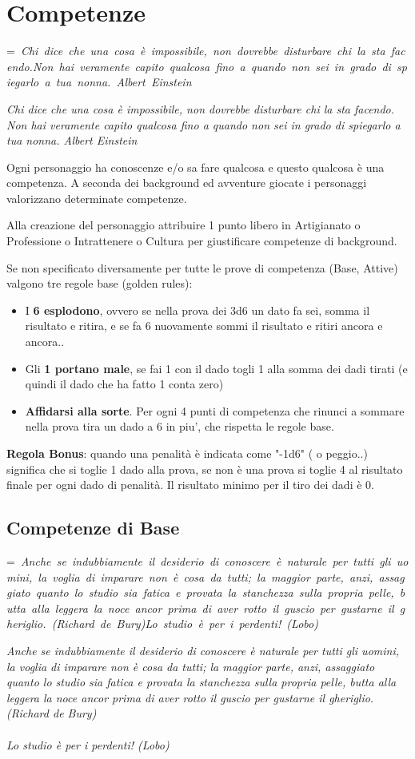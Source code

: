\documentclass[a4paper,11pt,twoside,openany]{book}
\makeatletter
\newcommand{\mybox}[1]{%
	\setbox0=\hbox{#1}%
	\setlength{\@tempdima}{\dimexpr\wd0+13pt}%
	\begin{tcolorbox}[boxrule=0.5pt,arc=4pt, breakable,enhanced,
		left=6pt,right=6pt,top=6pt,bottom=6pt,boxsep=0pt,width=\@tempdima]
		#1
	\end{tcolorbox}
}
\makeatother
\begin{document}
\pagebreak

\section{Competenze}

\label{competenze}
\mybox{\textit{
Chi dice che una cosa è impossibile, non dovrebbe disturbare chi la sta facendo.\\
Non hai veramente capito qualcosa fino a quando non sei in grado di spiegarlo a tua nonna. Albert Einstein}}\medskip


Ogni personaggio ha conoscenze e/o sa fare qualcosa e questo qualcosa è una competenza. A seconda dei background ed avventure giocate i personaggi valorizzano determinate competenze.

Alla creazione del personaggio attribuire 1 punto libero in Artigianato o Professione o Intrattenere o Cultura per giustificare competenze di background.

Se non specificato diversamente per tutte le prove di competenza (Base, Attive) valgono tre regole base  (golden rules):

\begin{itemize}
\item 
I \textbf{6 esplodono}, ovvero se nella prova dei 3d6 un dato fa sei, somma il risultato e ritira, e se fa 6 nuovamente sommi il risultato e ritiri ancora e ancora.. 
\item 
Gli \textbf{1 portano male}, se fai 1 con il dado togli 1 alla somma dei dadi tirati (e quindi il dado che ha fatto 1 conta zero) 
\item 
\textbf{Affidarsi alla sorte}. Per ogni 4 punti di competenza che rinunci a sommare nella prova tira un dado a 6 in piu', che rispetta le regole base. 
\end{itemize}

\textbf{Regola Bonus}: quando una penalità è indicata come "-1d6" ( o peggio..) significa che si toglie 1 dado alla prova, se non è una prova si toglie 4 al risultato finale per ogni dado di penalità. Il risultato minimo per il tiro dei dadi è 0.


\subsection{Competenze di Base}

\label{competenze-di-base}

\mybox{\textit{
Anche se indubbiamente il desiderio di conoscere è naturale per tutti gli uomini, la voglia di imparare non è cosa da tutti; la maggior parte, anzi, assaggiato quanto lo studio sia fatica e provata la stanchezza sulla propria pelle, butta alla leggera la noce ancor prima di aver rotto il guscio per gustarne il gheriglio. (Richard de Bury)\\\\
Lo studio è per i perdenti! (Lobo)
}}\medskip
\end{document}
